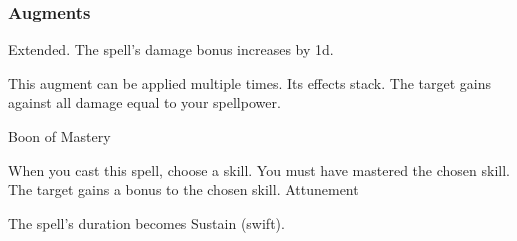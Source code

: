 \subsubsection{Augments}
 Extended.
The spell's damage bonus increases by \plus1d.
\par
This augment can be applied multiple times.
Its effects stack.
The target gains  against all damage equal to your spellpower.
\begin{spellsection}{Boon of Mastery}
\begin{spellheader}
\end{spellheader}
\begin{spellcontent}
\begin{spelltargetinginfo}
\end{spelltargetinginfo}
\begin{spelleffects}
\spellspecial
When you cast this spell, choose a skill.
You must have mastered the chosen skill.
\spelleffect
The target gains a  bonus to the chosen skill.
\spelldur Attunement
\end{spelleffects}
\end{spellcontent}
\begin{spellfooter}
\miscastexplode
\end{spellfooter}
\begin{spellcantrip}
The spell's duration becomes Sustain (swift).
\end{spellcantrip}
\end{spellsection}
